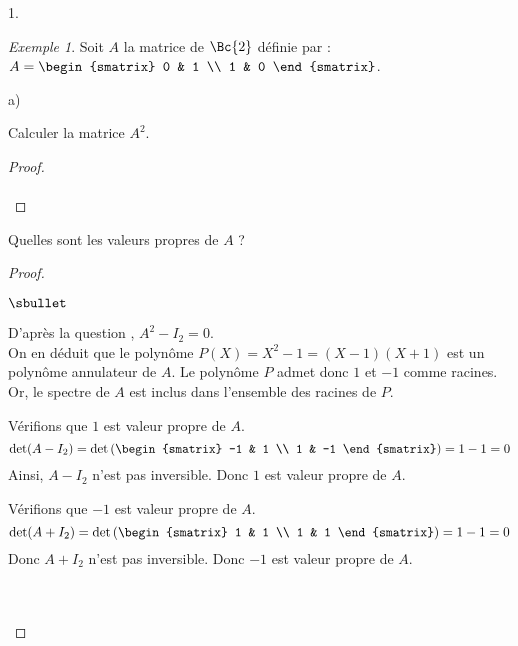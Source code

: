 \documentclass[11pt]{article}%
\begin{document}
\begin{noliste}{1.}
  \setlength{\itemsep}{4mm}
\item {\it Exemple 1}. Soit $A$ la matrice de $\Bc{2}$ définie par :
  $A = 
  \begin{smatrix} 
    0 & 1 \\ 
    1 & 0
  \end{smatrix}$.
  \begin{noliste}{a)}
    \setlength{\itemsep}{2mm}
  \item Calculer la matrice $A^2$.
    
    \begin{proof}~\\[-.6cm]%
      ~\\[-1cm]
    \end{proof}
    
  \item Quelles sont les valeurs propres de $A$ ?
	
    \begin{proof}~
      \begin{noliste}{$\sbullet$}
      \item D'après la question , $A^2 - I_2 = 0$.\\
        On en déduit que le polynôme $P(X) = X^2-1 = (X-1)(X+1)$ est
        un polynôme annulateur de $A$. Le polynôme $P$ admet donc $1$
        et $-1$ comme racines.\\
        Or, le spectre de $A$ est inclus dans l'ensemble des racines
        de $P$. %

      \item Vérifions que $1$ est valeur propre de $A$.
	\[
	\det (A-I_2) = \det
        \left(
        \begin{smatrix}
          -1 & 1 \\
          1 & -1
	\end{smatrix}
        \right) = 1 - 1 = 0
	\]
	Ainsi, $A-I_2$ n'est pas inversible. Donc $1$ est valeur
        propre de $A$.
      \item Vérifions que $-1$ est valeur propre de $A$.
	\[
	\det (A+I_2) = \det \left(
          \begin{smatrix} 
            1 & 1 \\
            1 & 1
          \end{smatrix} \right) = 1 - 1 = 0
	\]
        Donc $A+I_2$ n'est pas inversible. Donc $-1$ est valeur propre
        de $A$.
      \end{noliste}
      ~\\[-1.4cm]      
      ~\\[-1.4cm]
    \end{proof}
	


\end{noliste}
\end{noliste}
\end{document}
